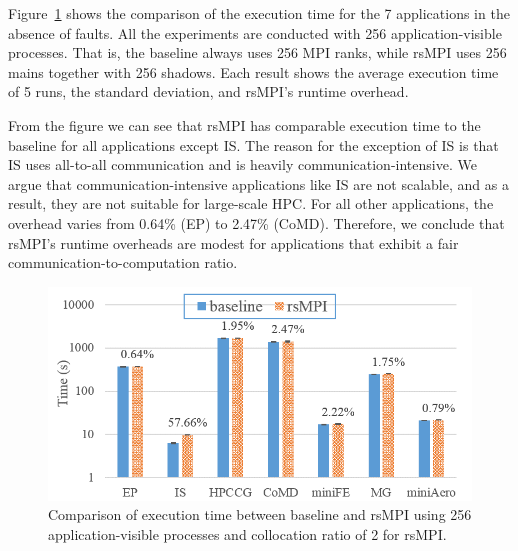 Figure~\ref{fig:runtime_overhead} shows the comparison of the execution time for the 7 applications in the absence of faults. All the experiments are conducted with 256 application-visible processes. That is, the baseline always uses 256 MPI ranks, while rsMPI uses 256 mains together with 256 shadows. Each result shows the average execution time of 5 runs, the standard deviation, and rsMPI's runtime overhead. %

From the figure we can see that rsMPI has comparable execution time to the baseline for all applications except IS. The reason for the exception of IS is that IS uses all-to-all communication and is heavily communication-intensive. %
We argue that communication-intensive applications like IS are not scalable, and as a result, they are not suitable for large-scale HPC. 
For all other applications, the overhead varies from 0.64\% (EP) to 2.47\% (CoMD). %
Therefore, we conclude that rsMPI's runtime overheads are modest for applications that exhibit a fair communication-to-computation ratio.

\begin{figure}[!t]
  \begin{center}
      \includegraphics[width=0.9\columnwidth]{figures/runtime_overhead_hpcc}
  \end{center}
  \vskip -0.1in
  \caption{Comparison of execution time between baseline and rsMPI using 256 application-visible processes and collocation ratio of 2 for rsMPI.}
  \label{fig:runtime_overhead}
\end{figure}

